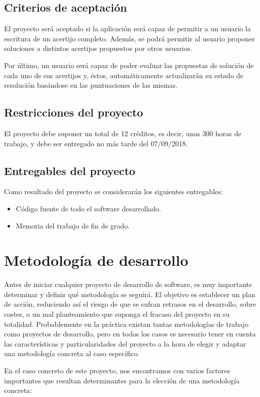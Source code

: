\subsection{Criterios de aceptación}
El proyecto será aceptado si la aplicación será capaz de permitir a un usuario la escritura de un acertijo completo. Además, se podrá permitir al usuario proponer soluciones a distintos acertijos propuestos por otros usuarios. 

Por último, un usuario será capaz de poder evaluar las propuestas de solución de cada uno de sus acertijos y, éstos, automáticamente actualizarán su estado de resolución basándose en las puntuaciones de las mismas.
\subsection{Restricciones del proyecto}
El proyecto debe suponer un total de 12 créditos, es decir, unas 300 horas de trabajo, y debe ser entregado no más tarde del 07/09/2018.

\subsection{Entregables del proyecto}
Como resultado del proyecto se considerarán los siguientes entregables:
\begin{itemize}
    \item Código fuente de todo el software desarrollado.
    \item Memoria del trabajo de fin de grado.
\end{itemize}

\section{Metodología de desarrollo}
Antes de iniciar cualquier proyecto de desarrollo de software, es muy importante determinar y definir qué metodología se seguirá. El objetivo es establecer un plan de acción, reduciendo así el riesgo de que se sufran retrasos en el desarrollo, sobre costes, o un mal planteamiento que suponga el fracaso del proyecto en su totalidad. Probablemente en la práctica existan tantas metodologías de trabajo como proyectos de desarrollo, pero en todos los casos es necesario tener en cuenta las características y particularidades del proyecto a la hora de elegir y adaptar una metodología concreta al caso específico.

En el caso concreto de este proyecto, nos encontramos con varios factores importantes que resultan determinantes para la elección de una metodología concreta:

